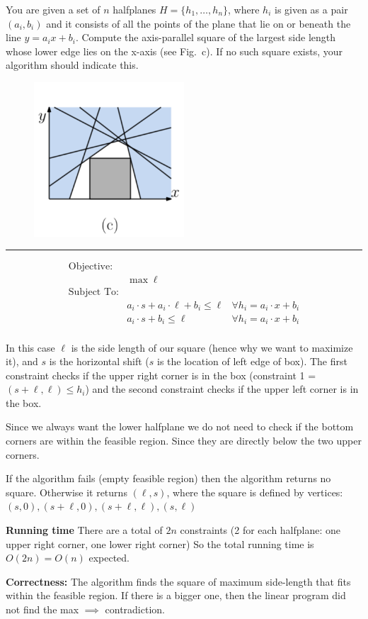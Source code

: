 \documentclass[11pt]{article}
\begin{document}

You are given a set of $n$ halfplanes $H = \{h_1,\ldots,h_n\}$, where
$h_i$ is given as a pair $(a_i,b_i)$ and it consists of all the points
of the plane that lie on or beneath the line $y = a_ix + b_i$. Compute
the axis-parallel square of the largest side length whose lower edge
lies on the x-axis (see Fig.~c). If no such square exists, your
algorithm should indicate this.

\begin{figure}[h]
  \centering
  \includegraphics[width = 0.5\textwidth]{lp_c.png}
\end{figure}

\hrule

\begin{align*}
  \text{Objective: }\, & & \\
  & \max \ell & \\
  \text{Subject To:} & & \\
  & a_i \cdot s + a_i \cdot \ell + b_i \leq \ell & \forall h_i = a_i \cdot x + b_i\\
  & a_i \cdot s + b_i \leq \ell & \forall h_i = a_i \cdot x + b_i\\
\end{align*}

In this case $\ell$ is the side length of our square (hence why we want to maximize it),
and $s$ is the horizontal shift ($s$ is the location of left edge of box).
The first constraint checks if the upper right corner is in the box (constraint 1 = $(s + \ell, \ell) \leq h_i$)
and the second constraint checks if the upper left corner is in the box.

Since we always want the lower halfplane we do not need to check if the bottom corners are 
within the feasible region. Since they are directly below the two upper corners. 

If the algorithm fails (empty feasible region) then the algorithm returns no square. Otherwise it returns
$(\ell, s)$, where the square is defined by vertices: $(s, 0), (s + \ell, 0), (s + \ell, \ell), (s, \ell)$

\textbf{Running time} There are a total of $2n$ constraints (2 for each halfplane: one upper right corner, one lower right corner)
So the total running time is $O(2n) = O(n)$ expected.

\textbf{Correctness:} The algorithm finds the square of maximum side-length that fits within the feasible region.
If there is a bigger one, then the linear program did not find the max $\implies$ contradiction.
\end{document}
